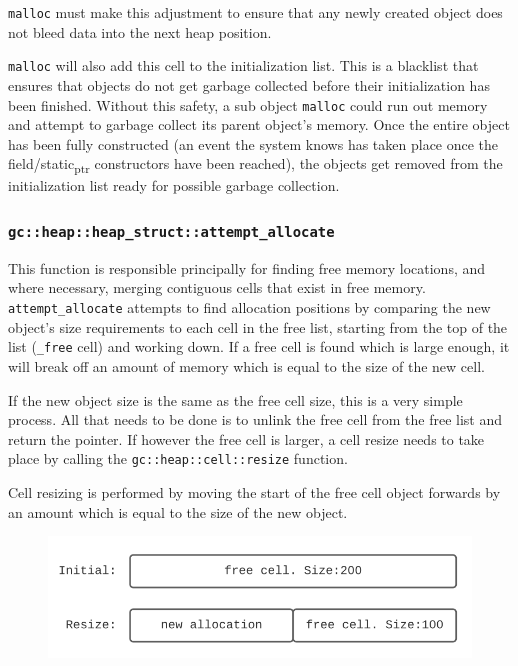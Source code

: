 \documentclass[11pt]{article}
\begin{document}
\texttt{malloc} must make this adjustment to ensure that any newly created object does not bleed data into the next heap position.

\texttt{malloc} will also add this cell to the initialization list. This is a blacklist that ensures that objects do not 
get garbage collected before their initialization has been finished. Without this safety, a sub object \texttt{malloc} could run out 
memory and attempt to garbage collect its parent object's memory.
Once the entire object has been fully constructed (an event the system knows has taken place once the field/static\textsubscript{ptr} constructors have been reached),
the objects get removed from the initialization list ready for possible garbage collection.
\subsubsection{\texttt{gc::heap::heap\_struct::attempt\_allocate}}
\label{sec:org8e7a864}
This function is responsible principally for finding free memory locations, and where necessary, merging contiguous cells that exist in free memory.
\texttt{attempt\_allocate} attempts to find allocation positions by comparing the new object's size requirements to each cell in the free list, starting
from the top of the list (\texttt{\_free} cell) and working down.
If a free cell is found which is large enough, it will break off an amount of memory which is equal to the size of the new cell.

If the new object size is the same as the free cell size, this is a very simple process. All that needs to be done is to unlink the 
free cell from the free list and return the pointer.
If however the free cell is larger, a cell resize needs to take place by calling the \texttt{gc::heap::cell::resize} function.

Cell resizing is performed by moving the start of the free cell object forwards by an amount which is equal to the size of the new object.

\begin{figure}[H]
    \begin{center}
    \includegraphics[scale=0.5]{./report_srcs/initial_to_resize.png}
    \end{center}
\end{figure}
\end{document}
